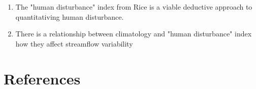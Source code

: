 \documentclass{article}
\begin{document}
    \begin{enumerate}
        \item The "human disturbance" index from Rice is a viable deductive approach to quantitativing human disturbance. 
        \item There is a relationship  between climatology and "human disturbance" index how they affect streamflow variability 
    \end{enumerate}

\section{References}
\end{document}
